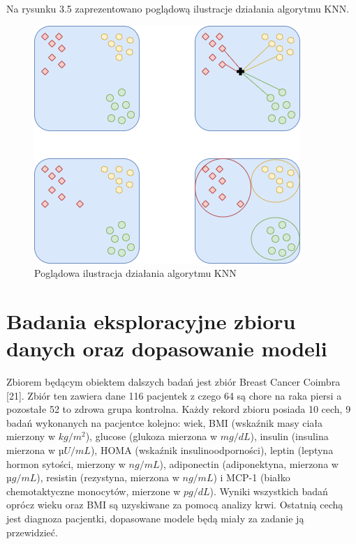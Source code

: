 \documentclass[a4paper,12pt,oneside]{book}
\begin{document}
Na rysunku 3.5 zaprezentowano poglądową ilustracje działania algorytmu KNN.
\begin{figure}[h]
\centering
\includegraphics[scale=0.6]{KNN.png}
\caption{Poglądowa ilustracja działania algorytmu KNN}
\end{figure}


\chapter{Badania eksploracyjne zbioru danych oraz dopasowanie modeli}
Zbiorem będącym obiektem dalszych badań jest zbiór Breast Cancer Coimbra [21]. Zbiór ten zawiera dane 116 pacjentek z czego 64 są chore na raka piersi a pozostałe 52 to zdrowa grupa kontrolna. Każdy rekord zbioru posiada 10 cech, 9 badań wykonanych na pacjentce kolejno: wiek, BMI (wskaźnik masy ciała mierzony w $kg/m^{2}$), glucose (glukoza mierzona w $mg/dL$), insulin (insulina mierzona w $µU/mL$), HOMA (wskaźnik insulinoodporności), leptin (leptyna hormon sytości, mierzony w $ng/mL$), adiponectin (adiponektyna, mierzona w $µg/mL$), resistin (rezystyna, mierzona w $ng/mL$) i MCP-1 (białko chemotaktyczne monocytów, mierzone w $pg/dL$). Wyniki wszystkich badań oprócz wieku oraz BMI są uzyskiwane za pomocą analizy krwi. Ostatnią cechą jest diagnoza pacjentki, dopasowane modele będą miały za zadanie ją przewidzieć.
\end{document}
